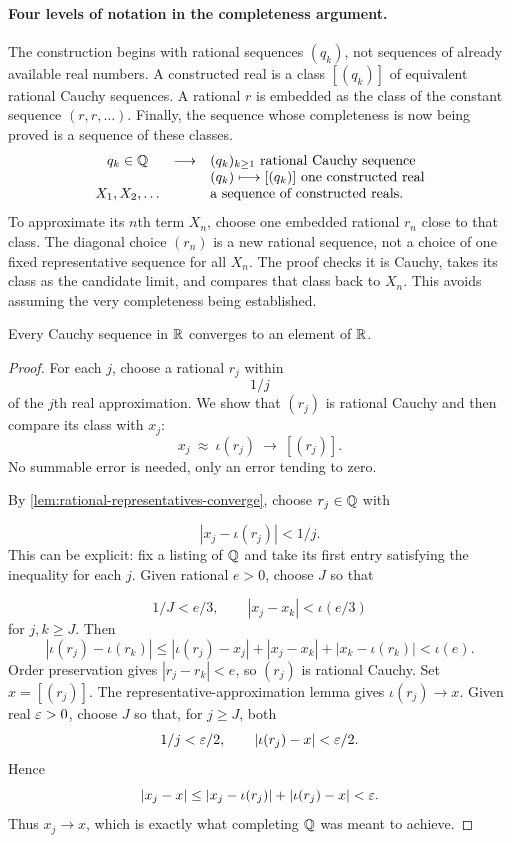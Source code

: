 \paragraph{Four levels of notation in the completeness argument.}
The construction begins with rational sequences $(q_k)$, not sequences of
already available real numbers. A constructed real is a class $[(q_k)]$
of equivalent rational Cauchy sequences. A rational $r$ is embedded as
the class of the constant sequence $(r,r,\ldots)$. Finally, the sequence
whose completeness is now being proved is a sequence of these classes.
\[
\begin{array}{ccl}
q_k\in\mathbb{Q} &\longrightarrow&(q_k)_{k\geq1}\text{ rational Cauchy sequence}\\
&&(q_k)\longmapsto[(q_k)]\text{ one constructed real}\\
X_1,X_2,\ldots&&\text{a sequence of constructed reals}.
\end{array}
\]
To approximate its $n$th term $X_n$, choose one embedded rational $r_n$
close to that class. The diagonal choice $(r_n)$ is a new rational
sequence, not a choice of one fixed representative sequence for all $X_n$.
The proof checks it is Cauchy, takes its class as the candidate limit,
and compares that class back to $X_n$. This avoids assuming the very
completeness being established.
\begin{theorem}
\label{thm:real-cauchy-complete}
Every Cauchy sequence in $\mathbb{R}$ converges to an element of $\mathbb{R}$.
\end{theorem}
\begin{proof}
For each $j$, choose a rational $r_j$ within
\[
1/j
\]
 of the $j$th real
approximation. We show that $(r_j)$ is rational Cauchy and then compare its
class with $x_j$:
\[
x_j\ \approx\ \iota(r_j)\ \longrightarrow\ [(r_j)].
\]
No summable error is needed, only an error tending to zero.

By \cref{lem:rational-representatives-converge}, choose $r_j\in\mathbb{Q}$ with

\[
|x_j-\iota(r_j)|<1/j.
\]
 This can be explicit: fix a listing of $\mathbb{Q}$ and
take its first entry satisfying the inequality for each $j$.
Given rational $e>0$, choose $J$ so that

\[
1/J<e/3,\qquad |x_j-x_k|<\iota(e/3)
\]
 for $j,k\geq J$. Then
\[
|\iota(r_j)-\iota(r_k)|
\leq|\iota(r_j)-x_j|+|x_j-x_k|+|x_k-\iota(r_k)|<\iota(e).
\]
Order preservation gives $|r_j-r_k|<e$, so $(r_j)$ is rational Cauchy.
Set $x=[(r_j)]$. The representative-approximation lemma gives
$\iota(r_j)\to x$. Given real $\varepsilon>0$, choose $J$ so that, for $j\geq J$,
both
\[
1/j<\varepsilon/2,\qquad |\iota(r_j)-x|<\varepsilon/2.
\]
 Hence
\[
|x_j-x|\leq|x_j-\iota(r_j)|+|\iota(r_j)-x|<\varepsilon.
\]
Thus $x_j\to x$, which is exactly what completing $\mathbb{Q}$ was meant to achieve.
\end{proof}

